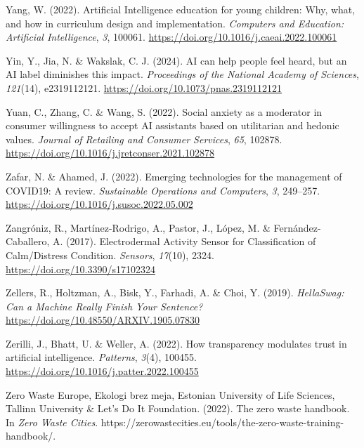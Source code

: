 \documentclass[
  letterpaper,
  DIV=11,
  numbers=noendperiod]{scrartcl}
\newlength{\cslhangindent}
\newenvironment{CSLReferences}[2] %
 {\begin{list}{}{%
  \setlength{\itemindent}{0pt}
  \setlength{\leftmargin}{0pt}
  \setlength{\parsep}{0pt}
  \ifodd #1
   \setlength{\leftmargin}{\cslhangindent}
   \setlength{\itemindent}{-1\cslhangindent}
  \fi
  \setlength{\itemsep}{#2\baselineskip}}}
 {\end{list}}
\begin{document}
\begin{CSLReferences}{1}{0}
Yang, W. (2022). Artificial {Intelligence} education for young children:
{Why}, what, and how in curriculum design and implementation.
\emph{Computers and Education: Artificial Intelligence}, \emph{3},
100061. \url{https://doi.org/10.1016/j.caeai.2022.100061}

Yin, Y., Jia, N. \& Wakslak, C. J. (2024). {AI} can help people feel
heard, but an {AI} label diminishes this impact. \emph{Proceedings of
the National Academy of Sciences}, \emph{121}(14), e2319112121.
\url{https://doi.org/10.1073/pnas.2319112121}

Yuan, C., Zhang, C. \& Wang, S. (2022). Social anxiety as a moderator in
consumer willingness to accept {AI} assistants based on utilitarian and
hedonic values. \emph{Journal of Retailing and Consumer Services},
\emph{65}, 102878.
\url{https://doi.org/10.1016/j.jretconser.2021.102878}

Zafar, N. \& Ahamed, J. (2022). Emerging technologies for the management
of {COVID19}: {A} review. \emph{Sustainable Operations and Computers},
\emph{3}, 249--257. \url{https://doi.org/10.1016/j.susoc.2022.05.002}

Zangróniz, R., Martínez-Rodrigo, A., Pastor, J., López, M. \&
Fernández-Caballero, A. (2017). Electrodermal {Activity Sensor} for
{Classification} of {Calm}/{Distress Condition}. \emph{Sensors},
\emph{17}(10), 2324. \url{https://doi.org/10.3390/s17102324}

Zellers, R., Holtzman, A., Bisk, Y., Farhadi, A. \& Choi, Y. (2019).
\emph{{HellaSwag}: {Can} a {Machine Really Finish Your Sentence}?}
\url{https://doi.org/10.48550/ARXIV.1905.07830}

Zerilli, J., Bhatt, U. \& Weller, A. (2022). How transparency modulates
trust in artificial intelligence. \emph{Patterns}, \emph{3}(4), 100455.
\url{https://doi.org/10.1016/j.patter.2022.100455}

Zero Waste Europe, Ekologi brez meja, Estonian University of Life
Sciences, Tallinn University \& Let's Do It Foundation. (2022). The zero
waste handbook. In \emph{Zero Waste Cities}.
https://zerowastecities.eu/tools/the-zero-waste-training-handbook/.


\end{CSLReferences}
\end{document}
